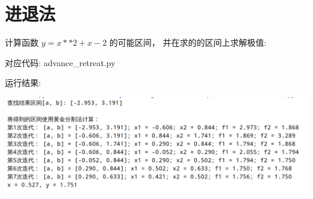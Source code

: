 \documentclass[a4paper,11pt]{article} [NO-DEFAULT-PACKAGES] \usepackage{wx672hyperref}
\begin{document}
\section*{进退法}
\label{sec:org3876c12}
计算函数 \(y = x**2 + x - 2\) 的可能区间， 并在求的的区间上求解极值:

对应代码: advance\_retreat.py

运行结果:
\begin{center}
\includegraphics[width=0.8\linewidth]{2021-03-22_16-04-15_screenshot.png}
\end{center}
\end{document}
